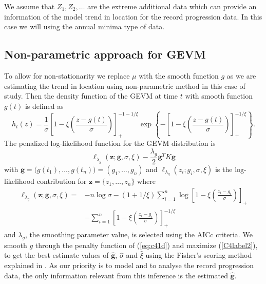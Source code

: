 \documentclass[10pt]{article}
\begin{document}
We assume that $Z_1,Z_2, \ldots $ are the extreme additional data 
which can provide an information of the model trend in location for
the record progression data. In this case we will using the
annual minima type of data. 

\subsection{Non-parametric approach for GEVM}



To allow for non-stationarity we replace $\mu$ with the smooth
function $g$ as we are estimating the trend in location using
non-parametric method in this case of study. Then the density function
of the GEVM at time $t$ with smooth function $g(t)$ is defined as 
\[h_t(z) =
\frac{1}{\sigma}\left[1-\xi\left(\frac{z-g(t)}{\sigma}\right)\right]^{-1-1/\xi}_+
\exp\left\{-\left[1-\xi\left(\frac{z-g(t)}{\sigma}\right)\right]^{-1/\xi}_+\right\}.\]
The penalized log-likelihood function for the GEVM distribution is
\begin{equation}
  \label{eq:c41d}
\ell_{\lambda_g}(\pmb{z};\pmb{g},\sigma,\xi)-\frac{\lambda_g}{2}\pmb{g}^TK\pmb{g}
\end{equation}
with $\pmb{g}=\big(g(t_1),\ldots,g(t_n)\big)= (g_1,\ldots,g_n)$ and  $\ell_{\lambda_g}(z_i;g_i,\sigma,\xi)$ is the log-likelihood contribution for
$\pmb{z}=\{z_1,\ldots,z_n\}$ where
\begin{align}
\ell_{\lambda_g}(\pmb{z};\pmb{g},\sigma,\xi) = & -n\log\sigma
-(1+1/\xi)\sum^n_{i=1}\log\left [1-\xi\left(\frac{z_i-g_i}{\sigma}
 \right) \right]_+ \nonumber \\ 
& -  \sum^n_{i=1}\left [1-\xi\left(\frac{z_i-g_i}{\sigma}\right)\right]^{-1/\xi}_+
\label{C4label2}
\end{align}
and $\lambda_g$, the smoothing parameter value, is selected using the
AICc criteria. We smooth $g$ through the penalty function of
(\ref{eq:c41d}) and maximize (\ref{C4label2}), to get the best estimate
values of $\hat{\pmb{g}}$, $\hat{\sigma}$ and $\hat{\xi}$ using the
Fisher's scoring method explained in \citet{Adam2007}. As our priority
is to model and to analyse the record progression data, the only information
relevant from this inference is the estimated $\hat{\pmb{g}}$. 
\end{document}
